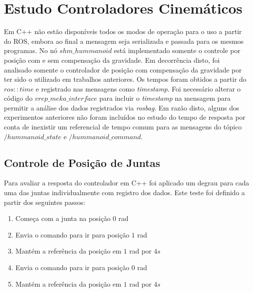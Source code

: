 



\section{Estudo Controladores Cinemáticos}

Em C++ não estão disponíveis todos os modos de operação para o uso a partir do ROS, embora ao final a mensagem seja serializada e passada para os mesmos programas. No nó $shm\_hummanoid$ está implementado somente o controle por posição com e sem compensação da gravidade. Em decorrência disto, foi analisado somente o controlador de posição com compensação da gravidade por ter sido o utilizado em trabalhos anteriores. Os tempos foram obtidos a partir do $ros::time$ e registrado nas mensagens como \textit{timestamp}. Foi necessário alterar o código do $vrep\_meka\_interface$ para incluir o \textit{timestamp} na mensagem para permitir a análise dos dados registrados via \textit{rosbag}. Em razão disto, alguns dos experimentos anteriores não foram incluídos no estudo do tempo de resposta por conta de inexistir um referencial de tempo comum para as mensagens do tópico $/hummanoid\_state$ e $/hummanoid\_command$.

\subsection{Controle de Posição de Juntas}\label{subsec:stepcpp}

Para avaliar a resposta do controlador em C++ foi aplicado um degrau para cada uma das juntas individualmente com registro dos dados. Este teste foi definido a partir dos seguintes passos:

\begin{enumerate}
    \item Começa com a junta na posição $0$ rad
    \item Envia o comando para ir para posição $1$ rad
    \item Mantém a referência da posição em $1$ rad por $4s$
    \item Envia o comando para ir para posição $0$ rad
    \item Mantém a referência da posição em $1$ rad por $4s$
\end{enumerate}

